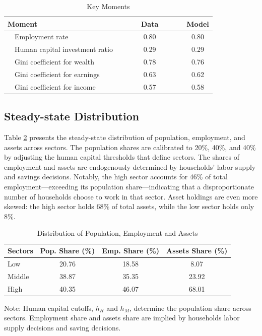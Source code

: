 \documentclass[12pt]{article}
\begin{document}
\begin{table}
    \caption{\protect\label{tbl:moments}Key Moments}
    
    \begin{centering}
    \begin{tabular}{lccccrrrc}
    \hline 
    Moment  &  &  &  & Data  &  &  &  & Model\tabularnewline
    \hline 
    ~~Employment rate  &  &  &  & 0.80  &  &  &  & 0.80\tabularnewline
    ~~Human capital investment ratio  &  &  &  & 0.29  &  &  &  & 0.29\tabularnewline
    ~~Gini coefficient for wealth  &  &  &  & 0.78  &  &  &  & 0.76\tabularnewline
    ~~Gini coefficient for earnings  &  &  &  & 0.63  &  &  &  & 0.62\tabularnewline
    ~~Gini coefficient for income  &  &  &  & 0.57  &  &  &  & 0.58\tabularnewline
    \hline 
    \end{tabular}
    \par\end{centering}
    \end{table}

\subsection{Steady-state Distribution}
Table \ref{tab:SSdistribution} presents the steady-state distribution of population, employment, and assets across sectors. The population shares are calibrated to 20\%, 40\%, and 40\% by adjusting the human capital thresholds that define sectors. The shares of employment and assets are endogenously determined by households' labor supply and savings decisions. Notably, the high sector accounts for 46\% of total employment—exceeding its population share—indicating that a disproportionate number of households choose to work in that sector. Asset holdings are even more skewed: the high sector holds 68\% of total assets, while the low sector holds only 8\%.  
 
\begin{table}[htbp]
\begin{centering}
\caption{Distribution of Population, Employment and Assets}
\begin{tabular}{lccc}
\toprule 
Sectors  & \multicolumn{1}{l}{Pop. Share (\%)} & \multicolumn{1}{l}{Emp. Share (\%)} & \multicolumn{1}{l}{Assets Share (\%)}\tabularnewline
\midrule 
Low  & 20.76 & 18.58 & 8.07\tabularnewline
Middle  & 38.87 & 35.35 & 23.92\tabularnewline
High  & 40.35 & 46.07 & 68.01\tabularnewline
\bottomrule
\end{tabular}\label{tab:SSdistribution}
\par\end{centering}
{\scriptsize Note: Human capital cutoffs, $h_{H}$ and $h_{M}$, determine
the population share across sectors. Employment share and assets share
are implied by households labor supply decisions and saving decisions. }{\scriptsize\par}
\end{table}
\end{document}
